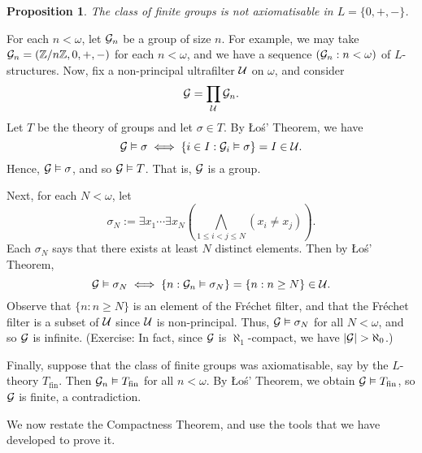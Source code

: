 \documentclass[10pt]{article}
\makeatletter
\newcommand{\Z}{\mathbb{Z}}
\theoremstyle{newstyle}
\newtheorem{prop}[thm]{Proposition}
\newenvironment{pf}[1][\proofname]{\par
  \pushQED{\qed}%
  \normalfont \topsep0\p@\relax
  \trivlist
  \item[\hskip\labelsep\scshape
  #1\@addpunct{.}]\ignorespaces
}{%
  \popQED\endtrivlist\@endpefalse
}
\makeatother
\begin{document}
\begin{prop}
The class of finite groups is not axiomatisable in $L = \{0, +, -\}$. 
\end{prop}
\begin{pf}
For each $n < \omega$, let ${\cal G}_n$ be a group of size $n$. For example, we may take 
${\cal G}_n = (\Z/n\Z, 0, +, -)$ for each $n < \omega$, and we have a sequence 
$({\cal G}_n : n < \omega)$ of $L$-structures. Now, fix a non-principal ultrafilter 
${\cal U}$ on $\omega$, and consider 
\[ {\cal G} = \prod_{\cal U} {\cal G}_n. \] 
Let $T$ be the theory of groups and let $\sigma \in T$. By \L{}o\'s' Theorem, we have 
\[ {\cal G} \vDash \sigma \iff \{i \in I : {\cal G}_i \vDash \sigma\} = I \in {\cal U}. \] 
Hence, ${\cal G} \vDash \sigma$, and so ${\cal G} \vDash T$. That is, ${\cal G}$ is a group. 

Next, for each $N < \omega$, let 
\[ \sigma_N := \exists x_1 \cdots \exists x_N \left( \bigwedge_{1 \leq i < j \leq N} (x_i \neq x_j) 
\right). \] 
Each $\sigma_N$ says that there exists at least $N$ distinct elements. Then by 
\L{}o\'s' Theorem, 
\[ {\cal G} \vDash \sigma_N \iff \{n : {\cal G}_n \vDash \sigma_N\} = \{n : n \geq N\} \in {\cal U}. \] 
Observe that $\{n : n \geq N\}$ is an element of the Fr\'echet filter, 
and that the Fr\'echet filter is a subset of ${\cal U}$ since ${\cal U}$ is non-principal. 
Thus, ${\cal G} \vDash \sigma_N$ for all $N < \omega$, and so ${\cal G}$ is infinite. 
(Exercise: In fact, since ${\cal G}$ is $\aleph_1$-compact, we have $|{\cal G}| > \aleph_0$.)

Finally, suppose that the class of finite groups was axiomatisable, say by the $L$-theory
$T_{\text{fin}}$. Then ${\cal G}_n \vDash T_{\text{fin}}$ for all $n < \omega$. By 
\L{}o\'s' Theorem, we obtain ${\cal G} \vDash T_{\text{fin}}$, so ${\cal G}$ is finite, 
a contradiction.
\end{pf}

We now restate the Compactness Theorem, and use the tools that we have developed to prove it. 
\end{document}
